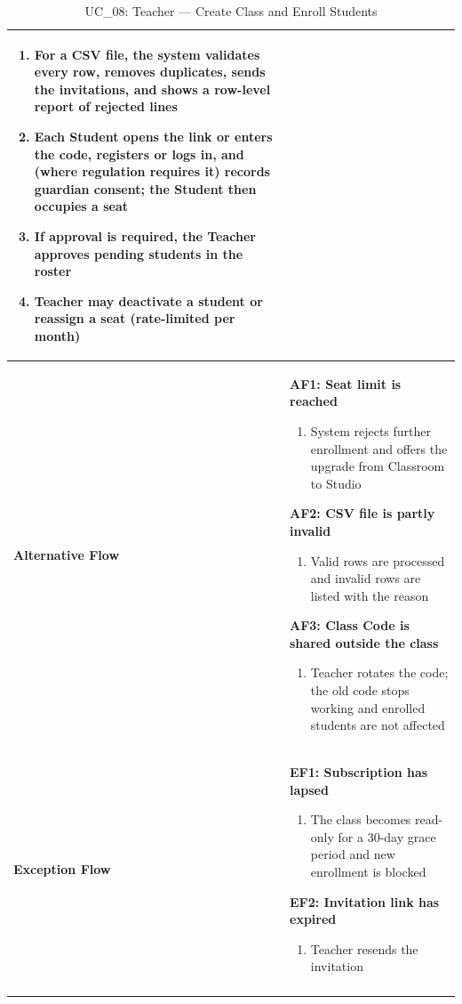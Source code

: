 \documentclass[a4paper]{article}
\newlength{\ucLeft}
\begin{document}
\begin{longtable}{|>{\bfseries}p{\ucLeft}|p{\dimexpr\linewidth-\ucLeft-2\tabcolsep-2\arrayrulewidth}|}
\begin{enumerate}[leftmargin=1.5em, nosep, topsep=2pt, partopsep=0pt, parsep=0pt, after=\strut]
    \item For a CSV file, the system validates every row, removes duplicates, sends the invitations, and shows a row-level report of rejected lines
    \item Each Student opens the link or enters the code, registers or logs in, and (where regulation requires it) records guardian consent; the Student then occupies a seat
    \item If approval is required, the Teacher approves pending students in the roster
    \item Teacher may deactivate a student or reassign a seat (rate-limited per month)
\end{enumerate}
\\ \hline
Alternative Flow &
\textbf{AF1: Seat limit is reached}
\begin{enumerate}[leftmargin=1.5em, nosep, topsep=2pt, partopsep=0pt, parsep=0pt, after=\strut]
    \item System rejects further enrollment and offers the upgrade from Classroom to Studio
\end{enumerate}
\textbf{AF2: CSV file is partly invalid}
\begin{enumerate}[leftmargin=1.5em, nosep, topsep=2pt, partopsep=0pt, parsep=0pt, after=\strut]
    \item Valid rows are processed and invalid rows are listed with the reason
\end{enumerate}
\textbf{AF3: Class Code is shared outside the class}
\begin{enumerate}[leftmargin=1.5em, nosep, topsep=2pt, partopsep=0pt, parsep=0pt, after=\strut]
    \item Teacher rotates the code; the old code stops working and enrolled students are not affected
\end{enumerate}
\\ \hline
Exception Flow &
\textbf{EF1: Subscription has lapsed}
\begin{enumerate}[leftmargin=1.5em, nosep, topsep=2pt, partopsep=0pt, parsep=0pt, after=\strut]
    \item The class becomes read-only for a 30-day grace period and new enrollment is blocked
\end{enumerate}
\textbf{EF2: Invitation link has expired}
\begin{enumerate}[leftmargin=1.5em, nosep, topsep=2pt, partopsep=0pt, parsep=0pt, after=\strut]
    \item Teacher resends the invitation
\end{enumerate}
\\ \hline
\caption{UC\_08: Teacher --- Create Class and Enroll Students}\label{tab:uc08_class}
\end{longtable}
\end{document}
